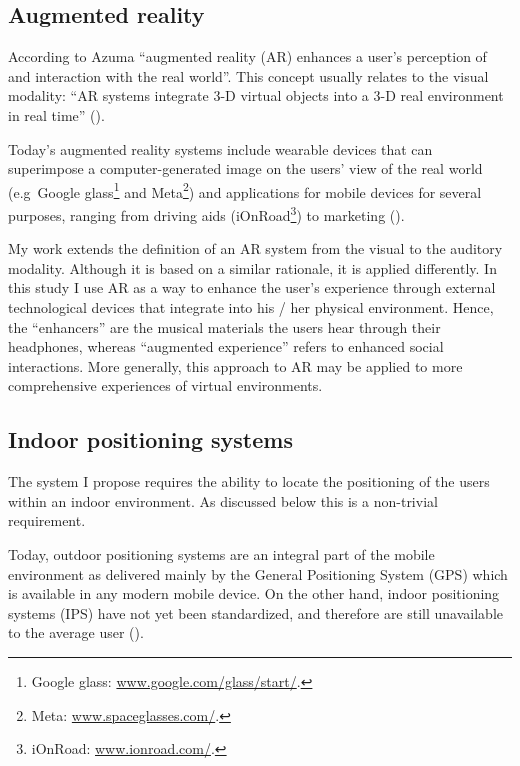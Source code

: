 \documentclass[a4paper,11pt]{article}
\begin{document}
\subsection{Augmented reality} \label{literature:ar}

According to Azuma ``augmented reality (AR) enhances a user's perception of and interaction with the real world''.
This concept usually relates to the visual modality: ``AR systems integrate 3-D virtual objects into a 3-D real environment in real time'' (\cite{azuma97}).

Today's augmented reality systems include wearable devices that can superimpose a computer-generated image on the users' view of the real world (e.g\ Google glass\footnote{Google glass: \href{http://www.google.com/glass/start/}{www.google.com/glass/start/}.} and Meta\footnote{Meta: \href{https://www.spaceglasses.com/}{www.spaceglasses.com/}.}) and applications for mobile devices for several purposes, ranging from driving aids (iOnRoad\footnote{iOnRoad: \href{http://www.ionroad.com/}{www.ionroad.com/}.}) to marketing (\cite{ikea}).

My work extends the definition of an AR system from the visual to the auditory modality.
Although it is based on a similar rationale, it is applied differently.
In this study I use AR as a way to enhance the user's experience through external technological devices that integrate into his / her physical environment.
Hence, the ``enhancers'' are the musical materials the users hear through their headphones, whereas ``augmented experience'' refers to enhanced social interactions.
More generally, this approach to AR may be applied to more comprehensive experiences of virtual environments.

\subsection{Indoor positioning systems} \label{literature:ips}

The system I propose requires the ability to locate the positioning of the users within an indoor environment.
As discussed below this is a non-trivial requirement.

Today, outdoor positioning systems are an integral part of the mobile environment as delivered mainly by the General Positioning System (GPS) which is available in any modern mobile device.
On the other hand, indoor positioning systems (IPS) have not yet been standardized, and therefore are still unavailable to the average user (\cite{web:turetsky}).
\end{document}
